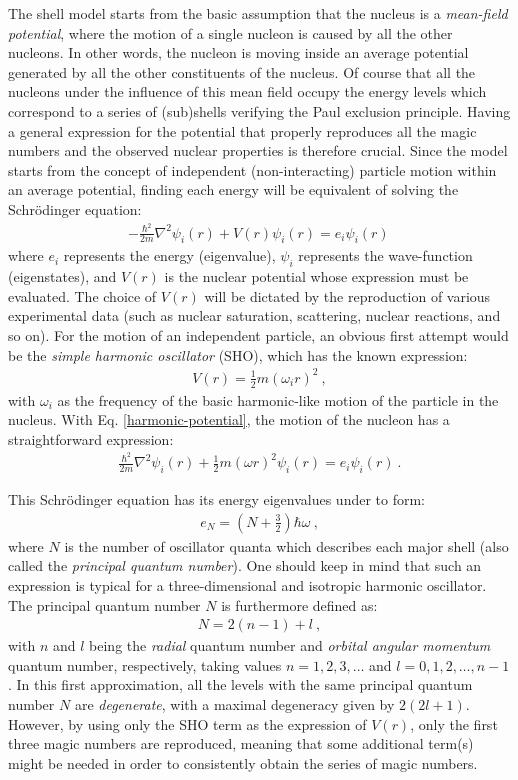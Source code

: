 The shell model starts from the basic assumption that the nucleus is a \emph{mean-field potential}, where the motion of a single nucleon is caused by all the other nucleons. In other words, the nucleon is moving inside an average potential generated by all the other constituents of the nucleus. Of course that all the nucleons under the influence of this mean field occupy the energy levels which correspond to a series of (sub)shells verifying the Paul exclusion principle. Having a general expression for the potential that properly reproduces all the magic numbers and the observed nuclear properties is therefore crucial. Since the model starts from the concept of independent (non-interacting) particle motion within an average potential, finding each energy will be equivalent of solving the Schrödinger equation:
\begin{align}
    -\frac{\hbar^2}{2m}\nabla ^2\psi_i(r)+V(r)\psi_i(r)=e_i\psi_i(r)\, 
    \label{schrodinger-single-particle-eq}
\end{align}
where $e_i$ represents the energy (eigenvalue), $\psi_i$ represents the wave-function (eigenstates), and $V(r)$ is the nuclear potential whose expression must be evaluated. The choice of $V(r)$ will be dictated by the reproduction of various experimental data (such as nuclear saturation, scattering, nuclear reactions, and so on). For the motion of an independent particle, an obvious first attempt would be the \emph{simple harmonic oscillator} (SHO), which has the known expression:
\begin{align}
    V(r)=\frac{1}{2}m(\omega_i r)^2\ ,
    \label{harmonic-potential}
\end{align}
with $\omega_i$ as the frequency of the basic harmonic-like motion of the particle in the nucleus. With Eq. \ref{harmonic-potential}, the motion of the nucleon has a straightforward expression:
\begin{align}
    \frac{\hbar^2}{2m}\nabla^2\psi_i(r)+\frac{1}{2}m(\omega r)^2\psi_i(r)=e_i\psi_i(r)\ .
\end{align}

This Schrödinger equation has its energy eigenvalues under to form:
\begin{align}
    e_N=\left(N+\frac{3}{2}\right)\hbar\omega\ ,
\end{align}
where $N$ is the number of oscillator quanta which describes each major shell (also called the \emph{principal quantum number}). One should keep in mind that such an expression is typical for a three-dimensional and isotropic harmonic oscillator. The principal quantum number $N$ is furthermore defined as:
\begin{align}
    N=2(n-1)+l\ ,
\end{align}
with $n$ and $l$ being the \emph{radial} quantum number and \emph{orbital angular momentum} quantum number, respectively, taking values $n=1,2,3,\dots$ and $l=0,1,2,\dots,n-1$. In this first approximation, all the levels with the same principal quantum number $N$ are \emph{degenerate}, with a maximal degeneracy given by $2(2l+1)$. However, by using only the SHO term as the expression of $V(r)$, only the first three magic numbers are reproduced, meaning that some additional term(s) might be needed in order to consistently obtain the series of magic numbers.

